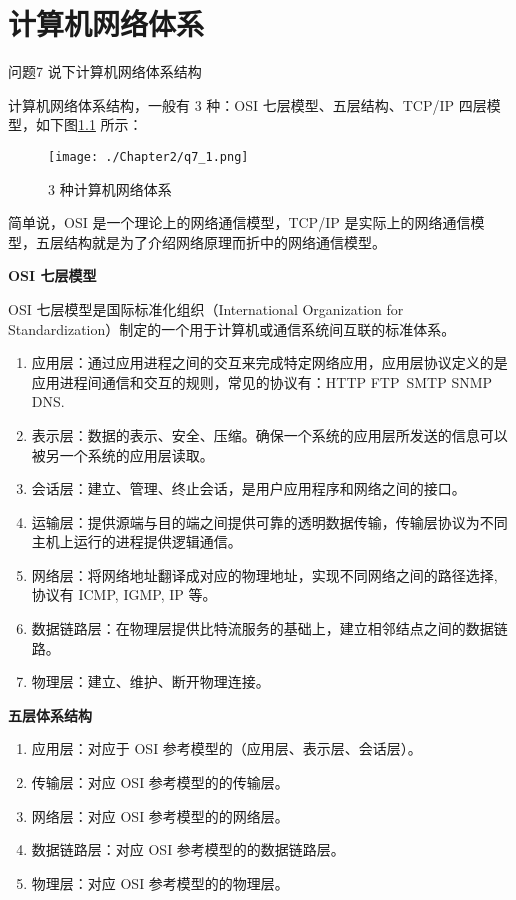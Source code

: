 \documentclass[cn,11pt,color=blue,lang=cn]{elegantbook}
\begin{document}
\chapter{计算机网络体系}
\begin{custom}{问题7}
说下计算机网络体系结构
\end{custom}
\begin{solution}
计算机网络体系结构，一般有 3 种：OSI 七层模型、五层结构、TCP/IP 四层模型，如下图\ref{fig7_1} 所示：

\begin{figure}[htbp]
\centering
\texttt{[image: ./Chapter2/q7\_1.png]}
\caption{3 种计算机网络体系}
\label{fig7_1}
\end{figure}
简单说，OSI 是一个理论上的网络通信模型，TCP/IP 是实际上的网络通信模型，五层结构就是为了介绍网络原理而折中的网络通信模型。

\begin{note} \textbf{OSI 七层模型} \end{note}

OSI 七层模型是国际标准化组织（International Organization for Standardization）制定的一个用于计算机或通信系统间互联的标准体系。
\begin{enumerate}
\item 应用层：通过应用进程之间的交互来完成特定网络应用，应用层协议定义的是应用进程间通信和交互的规则，常见的协议有：HTTP FTP SMTP SNMP DNS.
\item 表示层：数据的表示、安全、压缩。确保一个系统的应用层所发送的信息可以被另一个系统的应用层读取。
\item 会话层：建立、管理、终止会话，是用户应用程序和网络之间的接口。
\item 运输层：提供源端与目的端之间提供可靠的透明数据传输，传输层协议为不同主机上运行的进程提供逻辑通信。
\item 网络层：将网络地址翻译成对应的物理地址，实现不同网络之间的路径选择, 协议有 ICMP, IGMP, IP 等。
\item 数据链路层：在物理层提供比特流服务的基础上，建立相邻结点之间的数据链路。
\item 物理层：建立、维护、断开物理连接。
\end{enumerate}

\begin{note} \textbf{五层体系结构} \end{note}
\begin{enumerate}
\item 应用层：对应于 OSI 参考模型的（应用层、表示层、会话层）。
\item 传输层：对应 OSI 参考模型的的传输层。
\item 网络层：对应 OSI 参考模型的的网络层。
\item 数据链路层：对应 OSI 参考模型的的数据链路层。
\item 物理层：对应 OSI 参考模型的的物理层。
\end{enumerate}


\end{solution}
\end{document}
